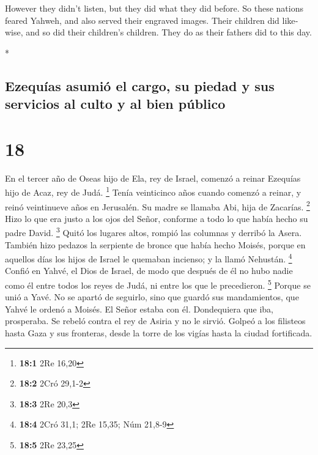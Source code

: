 \begin{paracol}{2}
\begin{otherlanguage}{english}
 However they didn't listen, but they did what they did
before.  So these nations feared Yahweh, and also served
their engraved images. Their children did likewise, and so did their
children's children. They do as their fathers did to this day.

\end{otherlanguage}

\switchcolumn[0]*

\hypertarget{ezequuxedas-asumiuxf3-el-cargo-su-piedad-y-sus-servicios-al-culto-y-al-bien-puxfablico}{%
\subsection{Ezequías asumió el cargo, su piedad y sus servicios al culto
y al bien
público}\label{ezequuxedas-asumiuxf3-el-cargo-su-piedad-y-sus-servicios-al-culto-y-al-bien-puxfablico}}

\hypertarget{section-34}{%
\section{18}\label{section-34}}

 En el tercer año de Oseas hijo de Ela, rey de Israel,
comenzó a reinar Ezequías hijo de Acaz, rey de Judá. \footnote{\textbf{18:1}
  2Re 16,20}  Tenía veinticinco años cuando comenzó a
reinar, y reinó veintinueve años en Jerusalén. Su madre se llamaba Abi,
hija de Zacarías. \footnote{\textbf{18:2} 2Cró 29,1-2} 
Hizo lo que era justo a los ojos del Señor, conforme a todo lo que había
hecho su padre David. \footnote{\textbf{18:3} 2Re 20,3} 
Quitó los lugares altos, rompió las columnas y derribó la Asera. También
hizo pedazos la serpiente de bronce que había hecho Moisés, porque en
aquellos días los hijos de Israel le quemaban incienso; y la llamó
Nehustán. \footnote{\textbf{18:4} 2Cró 31,1; 2Re 15,35; Núm 21,8-9}
 Confió en Yahvé, el Dios de Israel, de modo que después
de él no hubo nadie como él entre todos los reyes de Judá, ni entre los
que le precedieron. \footnote{\textbf{18:5} 2Re 23,25} 
Porque se unió a Yavé. No se apartó de seguirlo, sino que guardó sus
mandamientos, que Yahvé le ordenó a Moisés.  El Señor
estaba con él. Dondequiera que iba, prosperaba. Se rebeló contra el rey
de Asiria y no le sirvió.  Golpeó a los filisteos hasta
Gaza y sus fronteras, desde la torre de los vigías hasta la ciudad
fortificada.


\end{paracol}
